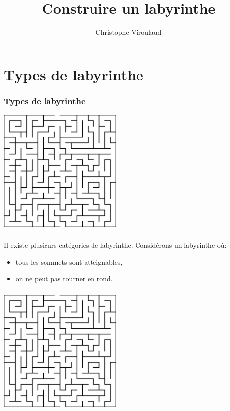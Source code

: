 \documentclass[svgnames,11pt]{beamer}
\author[]{Christophe Viroulaud}
\title{Construire un labyrinthe}
\date{\framebox{\textbf{Algo 23}}}
\institute{Terminale - NSI}
\begin{document}
\begin{frame}
    \titlepage
\end{frame}
\section{Types de labyrinthe}
\begin{frame}
    \frametitle{Types de labyrinthe}

    \begin{center}
        \centering
        \includegraphics[width=6cm]{ressources/labyrinthe.png}
    \end{center}
\end{frame}

\begin{frame}
    \frametitle{}

    \begin{aretenir}[Remarque]
        Il existe plusieurs catégories de labyrinthe. Considérons un labyrinthe où:
        \begin{itemize}
            \item tous les sommets sont atteignables,
            \item  on ne peut pas tourner en rond.

        \end{itemize}
    \end{aretenir}

\end{frame}
\begin{frame}
    \frametitle{}
    \begin{center}
        \centering
        \includegraphics[width=6cm]{ressources/labyrinthe.png}
    \end{center}


\end{frame}
\end{document}
